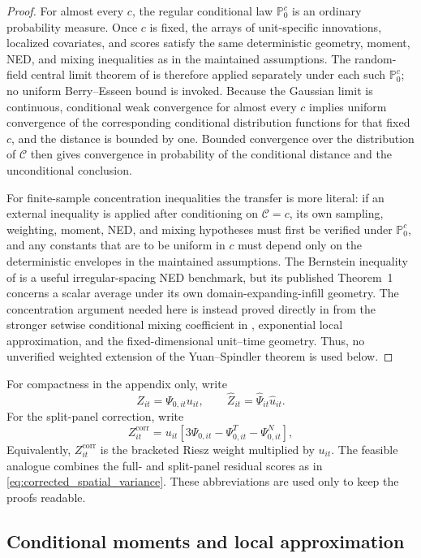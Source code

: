 \documentclass[11pt]{article}
\numberwithin{equation}{section}
\theoremstyle{remark}
\newcommand{\Pzero}{\mathbb P_0}
\begin{document}
\begin{proof}
For almost every $c$, the regular conditional law $\Pzero^c$ is an ordinary probability measure. Once $c$ is fixed, the arrays of unit-specific innovations, localized covariates, and scores satisfy the same deterministic geometry, moment, NED, and mixing inequalities as in the maintained assumptions. The random-field central limit theorem of \citet{jenishprucha2012} is therefore applied separately under each such $\Pzero^c$; no uniform Berry--Esseen bound is invoked. Because the Gaussian limit is continuous, conditional weak convergence for almost every $c$ implies uniform convergence of the corresponding conditional distribution functions for that fixed $c$, and the distance is bounded by one. Bounded convergence over the distribution of $\mathscr C$ then gives convergence in probability of the conditional distance and the unconditional conclusion.

For finite-sample concentration inequalities the transfer is more literal: if an external inequality is applied after conditioning on $\mathscr C=c$, its own sampling, weighting, moment, NED, and mixing hypotheses must first be verified under $\Pzero^c$, and any constants that are to be uniform in $c$ must depend only on the deterministic envelopes in the maintained assumptions. The Bernstein inequality of \citet{yuanspindler2025} is a useful irregular-spacing NED benchmark, but its published Theorem~1 concerns a scalar average under its own domain-expanding-infill geometry. The concentration argument needed here is instead proved directly in  from the stronger setwise conditional mixing coefficient in , exponential local approximation, and the fixed-dimensional unit--time geometry. Thus, no unverified weighted extension of the Yuan--Spindler theorem is used below.
\end{proof}

For compactness in the appendix only, write
$$
Z_{it}=\Psi_{0,it}u_{it},
\qquad
\widehat Z_{it}=\widehat\Psi_{it}\widehat u_{it}.
$$
For the split-panel correction, write
$$
Z_{it}^{\mathrm{corr}}
=
u_{it}
\left[
3\Psi_{0,it}
-\Psi_{0,it}^{T}
-\Psi_{0,it}^{N}
\right],
$$
Equivalently, $Z_{it}^{\mathrm{corr}}$ is the bracketed Riesz weight multiplied by $u_{it}$. The feasible analogue combines the full- and split-panel residual scores as in \eqref{eq:corrected_spatial_variance}. These abbreviations are used only to keep the proofs readable.

\subsection{Conditional moments and local approximation}
\label{app:localization}
\end{document}
